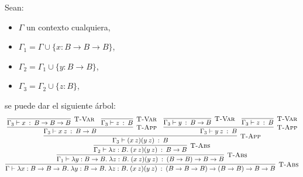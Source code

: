 \documentclass[a4paper]{article}
\begin{document}
Sean:
\begin{itemize}
\item $\Gamma$ un contexto cualquiera,
\item $\Gamma_{1} = \Gamma \cup \{ x:B\rightarrow B\rightarrow B\}$,
\item $\Gamma_{2} = \Gamma_{1} \cup \{ y:B\rightarrow B\}$,
\item $\Gamma_{3} = \Gamma_{2} \cup \{ z:B\}$,
\end{itemize}
se puede dar el siguiente \'arbol:
$$ \infer[\textsc{T-Abs}]
        {\Gamma \vdash \lambda x:B\rightarrow B\rightarrow B.\;
         \lambda y:B\rightarrow B.\;\lambda z:B.\; (x\: z)(y\:z)\: :\:
         (B\rightarrow B\rightarrow B)\rightarrow (B\rightarrow B)
         \rightarrow B \rightarrow B}
        {\infer[\textsc{T-Abs}]
              {\Gamma_{1} \vdash \lambda y:B\rightarrow B.\; \lambda z:B
               .\; (x\: z)(y\: z)\: :\: (B\rightarrow B) \rightarrow B
               \rightarrow B}
              {\infer[\textsc{T-Abs}]
                    {\Gamma_{2} \vdash \lambda z:B.\; (x\: z)(y\: z)\:
                     :\: B\rightarrow B}
                    {\infer[\textsc{T-App}]
                          {\Gamma_{3} \vdash (x\: z)(y\: z)\: :\: B}
                          {\infer[\textsc{T-App}]
                                {\Gamma_{3} \vdash x\: z\: :\:
                                 B\rightarrow B}
                                {\infer[\textsc{T-Var}]
                                      {\Gamma_{3} \vdash x\: :\:
                                       B\rightarrow B\rightarrow B}{}
                                 & \infer[\textsc{T-Var}]
                                      {\Gamma_{3} \vdash z\: :\: B}{}}
                           & \infer[\textsc{T-App}]
                                {\Gamma_{3} \vdash y\: z\: :\: B}
                                {\infer[\textsc{T-Var}]
                                      {\Gamma_{3} \vdash y\: :\:
                                       B \rightarrow B}{}
                                 & \infer[\textsc{T-Var}]
                                      {\Gamma_{3} \vdash z\: :\: B}{}}
                           }
                    }
              }
        } $$
\end{document}
